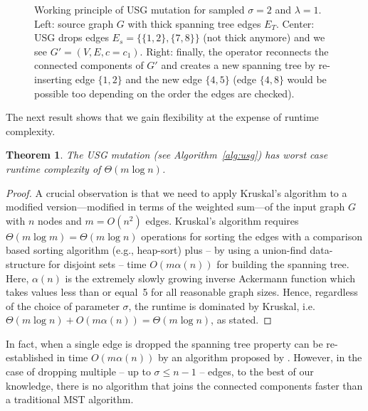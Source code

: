 \documentclass[twoside]{article}
\newtheorem{theorem}{Theorem}
\newtheorem{proof}{Proof}
\begin{document}
\begin{figure}[tbp]
\begin{minipage}[c]{0.328\columnwidth}
  \end{minipage}
  \caption{Working principle of USG mutation for sampled $\sigma = 2$ and $\lambda = 1$. Left: source graph $G$ with thick spanning tree edges $E_T$. Center: USG drops edges $E_s = \{\{1, 2\}, \{7, 8\}\}$ (not thick anymore) and we see $G' = (V, E, c = c_1)$. Right: finally, the operator reconnects the connected components of $G'$ and creates a new spanning tree by re-inserting edge $\{1, 2\}$ and the new edge $\{4, 5\}$ (edge $\{4, 8\}$ would be possible too depending on the order the edges are checked).}
  \label{fig:usg_detailed}
\end{figure}

The next result shows that we gain flexibility at the expense of runtime complexity.
\begin{theorem}\label{thm:runtime_usg}
The USG mutation (see Algorithm~\ref{alg:usg}) has worst case runtime complexity of $\Theta(m \log n)$.
\end{theorem}
\begin{proof}
A crucial observation is that we need to apply Kruskal's algorithm to a modified version---modified in terms of the weighted sum---of the input graph $G$ with $n$ nodes and $m=O(n^2)$ edges.
Kruskal's algorithm requires $\Theta(m \log m) = \Theta(m \log n)$ operations for sorting the edges with a comparison based sorting algorithm (e.g., heap-sort) plus -- by using a union-find data-structure for disjoint sets -- time $O(m\alpha(n))$ for building the spanning tree. %
Here, $\alpha(n)$ is the extremely slowly growing inverse Ackermann function which takes values less than or equal~5 for all reasonable graph sizes. Hence, regardless of the choice of parameter $\sigma$, the runtime is dominated by Kruskal, i.e. $\Theta(m \log n) + O(m \alpha(n)) = \Theta(m \log n)$, as stated.
\end{proof}

In fact, when a single edge is dropped the spanning tree property can be re-established in time $O(m \alpha(n))$ by an algorithm proposed by \citet{Tarjan1979}. However, in the case of dropping multiple -- up to $\sigma \leq n-1$ -- edges, to the best of our knowledge, there is no algorithm that joins the connected components faster than a traditional MST algorithm. 
\end{document}
